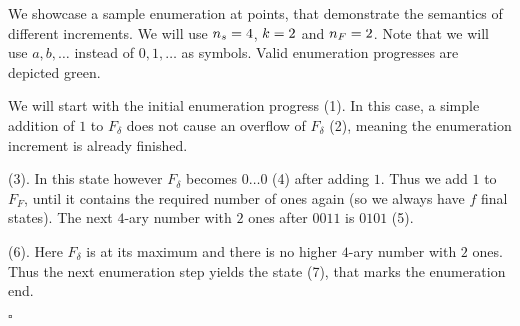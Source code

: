 \begin{example}
	We showcase a sample enumeration at points, that demonstrate the semantics of different increments. We will use ${n_s}=4$, $k=2$ and ${n_F}=2$. Note that we will use $a,b,\ldots$ instead of $0,1,\ldots$ as symbols. Valid enumeration progresses are depicted green.\par
	\vspace{0.4cm}\noindent
	\begin{minipage}{0.56\textwidth}
		We will start with the initial enumeration progress (1). In this case, a simple addition of $1$ to $F_\delta$ does not cause an overflow of $F_\delta$ (2), meaning the enumeration increment is already finished.\newline
		
		(3). In this state however $F_\delta$ becomes $0\ldots0$ (4) after adding $1$. Thus we add $1$ to $F_F$, until it contains the required number of ones again (so we always have $f$ final states). The next $4$-ary number with $2$ ones after $0011$ is $0101$ (5).\newline
		
		(6). Here $F_\delta$ is at its maximum and there is no higher $4$-ary number with $2$ ones. Thus the next enumeration step yields the state (7), that marks the enumeration end.
	\end{minipage}
	\hfill
	\begin{minipage}{0.4\textwidth}
	\end{minipage}\par
	\hfill$\square$
\end{example}


